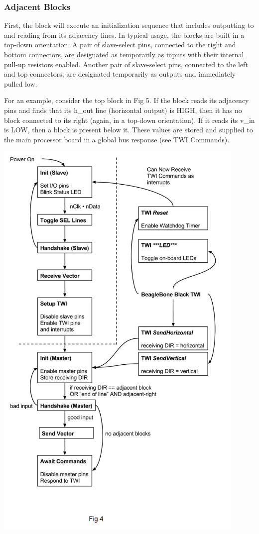 \documentclass[12pt,a4paper]{article}
\begin{document}
  \subsubsection{Adjacent Blocks}  
  First, the block will execute an initialization sequence that includes outputting to and reading from its adjacency lines. In typical usage, the blocks are built in a top-down orientation. A pair of slave-select pins, connected to the right and bottom connectors, are designated as temporarily as inputs with their internal pull-up resistors enabled. Another pair of slave-select pins, connected to the left and top connectors, are designated temporarily as outputs and immediately pulled low. 
  
  For an example, consider the top block in Fig 5. If the block reads its adjacency pins and finds that its h\_out line (horizontal output) is HIGH, then it has no block connected to its right (again, in a top-down orientation). If it reads its v\_in is LOW, then a block is present below it. These values are stored and supplied to the main processor board in a global bus response (see TWI Commands).
  
    \includegraphics[width=4.75in]{USD.png}\\
    
\end{document}
